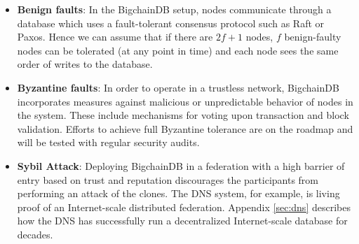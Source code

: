 \begin{itemize}
  \item \textbf{Benign faults}: In the BigchainDB setup, nodes communicate through a database which uses a fault-tolerant consensus protocol such as Raft or Paxos. Hence we can assume that if there are $2f + 1$ nodes, $f$ benign-faulty nodes can be tolerated (at any point in time) and each node sees the same order of writes to the database.
  \item \textbf{Byzantine faults}: In order to operate in a trustless network, BigchainDB incorporates measures against malicious or unpredictable behavior of nodes in the system. These include mechanisms for voting upon transaction and block validation. Efforts to achieve full Byzantine tolerance are on the roadmap and will be tested with regular security audits.
  \item \textbf{Sybil Attack}: Deploying BigchainDB in a federation with a high barrier of entry based on trust and reputation discourages the participants from performing an attack of the clones. The DNS system, for example, is living proof of an Internet-scale distributed federation. Appendix \ref{sec:dns} describes how the DNS has successfully run a decentralized Internet-scale database for decades.
\end{itemize}